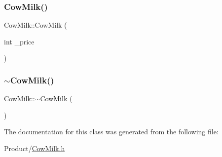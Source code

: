 \mbox{\label{classCowMilk_a34675ff493e61ca45c96d3c3fc1e195a}} 
\subsubsection{\texorpdfstring{CowMilk()}{CowMilk()}\hspace{0.1cm}{\footnotesize\ttfamily [2/2]}}
{\footnotesize\ttfamily Cow\+Milk\+::\+Cow\+Milk (\begin{DoxyParamCaption}\item[{int}]{\+\_\+price }\end{DoxyParamCaption})}

\mbox{\label{classCowMilk_ab9feca71e5a4f4bcb54c526f20d1c6dc}} 
\subsubsection{\texorpdfstring{$\sim$CowMilk()}{~CowMilk()}}
{\footnotesize\ttfamily Cow\+Milk\+::$\sim$\+Cow\+Milk (\begin{DoxyParamCaption}{ }\end{DoxyParamCaption})}



The documentation for this class was generated from the following file\+:\begin{DoxyCompactItemize}
\item 
Product/\mbox{\hyperlink{CowMilk_8h}{Cow\+Milk.\+h}}\end{DoxyCompactItemize}
